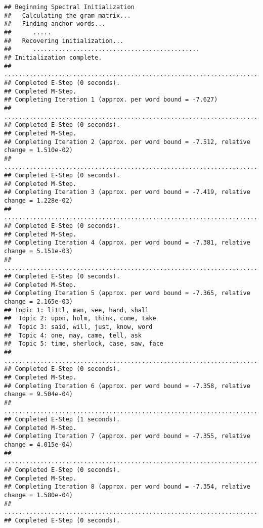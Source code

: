 \documentclass[
]{book}
\begin{document}
\begin{verbatim}
## Beginning Spectral Initialization 
##   Calculating the gram matrix...
##   Finding anchor words...
##      .....
##   Recovering initialization...
##      ..............................................
## Initialization complete.
## ....................................................................................................
## Completed E-Step (0 seconds). 
## Completed M-Step. 
## Completing Iteration 1 (approx. per word bound = -7.627) 
## ....................................................................................................
## Completed E-Step (0 seconds). 
## Completed M-Step. 
## Completing Iteration 2 (approx. per word bound = -7.512, relative change = 1.510e-02) 
## ....................................................................................................
## Completed E-Step (0 seconds). 
## Completed M-Step. 
## Completing Iteration 3 (approx. per word bound = -7.419, relative change = 1.228e-02) 
## ....................................................................................................
## Completed E-Step (0 seconds). 
## Completed M-Step. 
## Completing Iteration 4 (approx. per word bound = -7.381, relative change = 5.151e-03) 
## ....................................................................................................
## Completed E-Step (0 seconds). 
## Completed M-Step. 
## Completing Iteration 5 (approx. per word bound = -7.365, relative change = 2.165e-03) 
## Topic 1: littl, man, see, hand, shall 
##  Topic 2: upon, holm, think, come, take 
##  Topic 3: said, will, just, know, word 
##  Topic 4: one, may, came, tell, ask 
##  Topic 5: time, sherlock, case, saw, face 
## ....................................................................................................
## Completed E-Step (0 seconds). 
## Completed M-Step. 
## Completing Iteration 6 (approx. per word bound = -7.358, relative change = 9.504e-04) 
## ....................................................................................................
## Completed E-Step (1 seconds). 
## Completed M-Step. 
## Completing Iteration 7 (approx. per word bound = -7.355, relative change = 4.015e-04) 
## ....................................................................................................
## Completed E-Step (0 seconds). 
## Completed M-Step. 
## Completing Iteration 8 (approx. per word bound = -7.354, relative change = 1.580e-04) 
## ....................................................................................................
## Completed E-Step (0 seconds). 

\end{verbatim}
\end{document}
